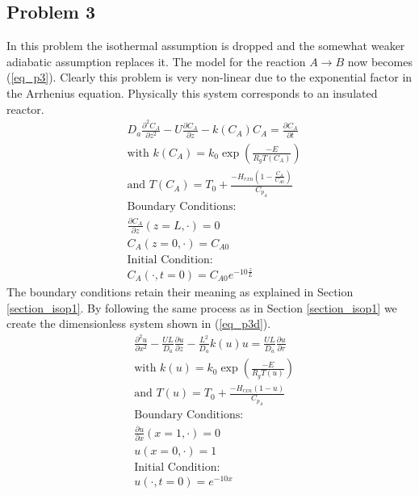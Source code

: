 \documentclass[11pt,fleqn]{article}
\theoremstyle{defstyle}
\begin{document}
\subsection{Problem 3}
\label{section_p3}
In this problem the isothermal assumption is dropped and the somewhat weaker adiabatic assumption replaces it. The model for the reaction $A \rightarrow B$ now becomes (\ref{eq_p3}). Clearly this problem is very non-linear due to the exponential factor in the 
Arrhenius equation. Physically this system corresponds to an insulated reactor.
\begin{equation}
\begin{aligned}
&D_a \frac{\partial^2 C_A}{\partial z^2} - U \frac{\partial C_A}{\partial z} - k(C_A)
C_A = \frac{\partial C_A}{\partial t} \\
& \text{with }k(C_A) = k_0 \exp \left(\frac{-E}{R_gT(C_A)}\right) \\
& \text{and } T(C_A) = T_0 + \frac{-H_{rxn} \left(1-\frac{C_A}{C_{A0}}\right)}{C_{p_A}} \\
&\text{Boundary Conditions:} \\
&\frac{\partial C_A}{\partial z}(z=L, \cdot) = 0\\
&C_A(z=0, \cdot) = C_{A0} \\
&\text{Initial Condition:} \\
& C_A(\cdot, t= 0) = C_{A0}e^{-10\frac{z}{L}}
\end{aligned}
\label{eq_p3}
\end{equation}
The boundary conditions retain their meaning as explained in Section \ref{section_isop1}. By following the same process as in Section \ref{section_isop1} we create the dimensionless system shown in (\ref{eq_p3d}).
\begin{equation}
\begin{aligned}
&\frac{\partial^2 u}{\partial x^2} - \frac{UL}{D_a}\frac{\partial u}{\partial z} - \frac{L^2}{D_a} k(u)u = \frac{UL}{D_a}\frac{\partial u}{\partial \tau} \\
& \text{with }k(u) = k_0 \exp\left(\frac{-E}{R_gT(u)}\right) \\
& \text{and } T(u) = T_0 + \frac{-H_{rxn} \left(1-u\right)}{C_{p_A}} \\
&\text{Boundary Conditions:} \\
&\frac{\partial u}{\partial x}(x=1, \cdot) = 0\\
&u(x=0, \cdot) = 1 \\
&\text{Initial Condition:} \\
& u(\cdot, t= 0) = e^{-10x}
\end{aligned}
\label{eq_p3d}
\end{equation}
\end{document}
